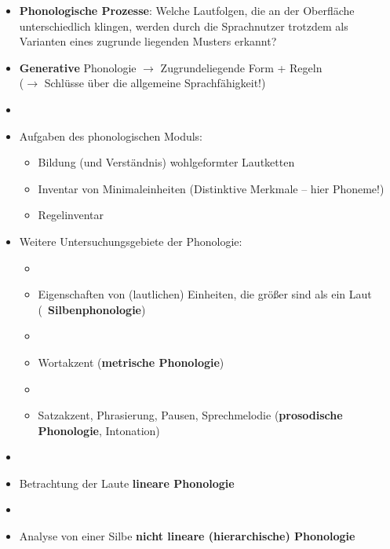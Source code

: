 \begin{frame}

\begin{itemize}
	\item \textbf{Phonologische Prozesse}: Welche Lautfolgen, die an der Oberfläche unterschiedlich klingen, werden durch die Sprachnutzer trotzdem als Varianten eines zugrunde liegenden Musters erkannt?

\ea \textipa{[ga{\textscr}t@n]} \vs 
\textipa{[ga:d\textsyllabic{n}]}
\z

\item \textbf{Generative} Phonologie $\rightarrow$ Zugrundeliegende Form +  Regeln\\
      ($\rightarrow$ Schlüsse über die allgemeine Sprachfähigkeit!) 
	\item[]
	\item Aufgaben des phonologischen Moduls:
	
	\begin{itemize}
		\item Bildung (und Verständnis) wohlgeformter Lautketten
		\item Inventar von Minimaleinheiten (Distinktive Merkmale -- hier Phoneme!)
		\item Regelinventar
	\end{itemize}
	 
\end{itemize}

\end{frame}


\begin{frame}

\begin{itemize}
	\item Weitere Untersuchungsgebiete der Phonologie:
	
	\begin{itemize}
		\item[]
		\item Eigenschaften von (lautlichen) Einheiten, die größer sind als ein Laut (\zB~\textbf{Silbenphonologie})
		\item[]
		\item Wortakzent (\textbf{metrische Phonologie})
		\item[]
		\item Satzakzent, Phrasierung, Pausen, Sprechmelodie (\textbf{prosodische Phonologie}, Intonation)
	\end{itemize}
	
	\item[]
	\item Betrachtung der Laute \ras \textbf{lineare Phonologie}
	\item[]
	\item Analyse von einer Silbe \ras \textbf{nicht lineare (hierarchische) Phonologie}
\end{itemize}

\end{frame}



